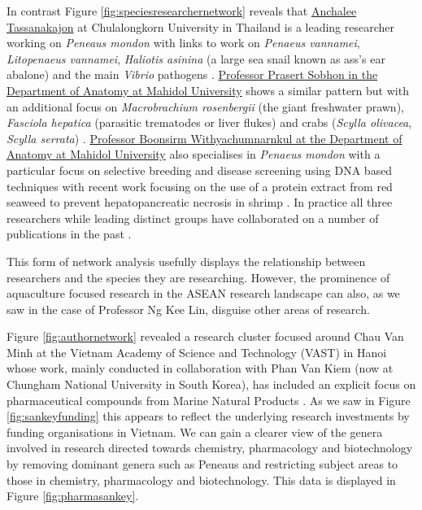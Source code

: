 \documentclass[openany]{book}
\theoremstyle{definition}
\theoremstyle{definition}
\theoremstyle{definition}
\theoremstyle{remark}
\begin{document}
In contrast Figure \ref{fig:speciesresearchernetwork} reveals that
\href{http://www.bc.sc.chula.ac.th/11Anchalee.html}{Anchalee
Tassanakajon} at Chulalongkorn University in Thailand is a leading
researcher working on \emph{Peneaus mondon} with links to work on
\emph{Penaeus vannamei}, \emph{Litopenaeus vannamei}, \emph{Haliotis
asinina} (a large sea snail known as ass's ear abalone) and the main
\emph{Vibrio} pathogens
\citep{Wongteerasupaya_1995, Supungul_2004, Kaewkascholkul_2016}.
\href{http://www.sc.mahidol.ac.th/scan/old/Prasert.htm}{Professor
Prasert Sobhon in the Department of Anatomy at Mahidol University} shows
a similar pattern but with an additional focus on \emph{Macrobrachium
rosenbergii} (the giant freshwater prawn), \emph{Fasciola hepatica}
(parasitic trematodes or liver flukes) and crabs (\emph{Scylla
olivacea}, \emph{Scylla serrata})
\citep{Meeratana_2006, Duangprom_2017, Preyavichyapugdee_2008}.
\href{http://www.sc.mahidol.ac.th/scan/old/Boonsirm.htm}{Professor
Boonsirm Withyachumnarnkul at the Department of Anatomy at Mahidol
University} also specialises in \emph{Penaeus mondon} with a particular
focus on selective breeding and disease screening using DNA based
techniques \citep{Wongteerasupaya_1995} with recent work focusing on the
use of a protein extract from red seaweed to prevent hepatopancreatic
necrosis in shrimp \citep{Boonsri_2016}. In practice all three
researchers while leading distinct groups have collaborated on a number
of publications in the past
\citep{Wongteerasupaya_1995, Pongtippatee_2007, Wongteerasupaya_1997}.

This form of network analysis usefully displays the relationship between
researchers and the species they are researching. However, the
prominence of aquaculture focused research in the ASEAN research
landscape can also, as we saw in the case of Professor Ng Kee Lin,
disguise other areas of research.

Figure \ref{fig:authornetwork} revealed a research cluster focused
around Chau Van Minh at the Vietnam Academy of Science and Technology
(VAST) in Hanoi whose work, mainly conducted in collaboration with Phan
Van Kiem (now at Chungham National University in South Korea), has
included an explicit focus on pharmaceutical compounds from Marine
Natural Products
\citep{Van_Minh_2017, Quang_2011, Thao_2015, Thao_2015a}. As we saw in
Figure \ref{fig:sankeyfunding} this appears to reflect the underlying
research investments by funding organisations in Vietnam. We can gain a
clearer view of the genera involved in research directed towards
chemistry, pharmacology and biotechnology by removing dominant genera
such as Peneaus and restricting subject areas to those in chemistry,
pharmacology and biotechnology. This data is displayed in Figure
\ref{fig:pharmasankey}.
\end{document}
